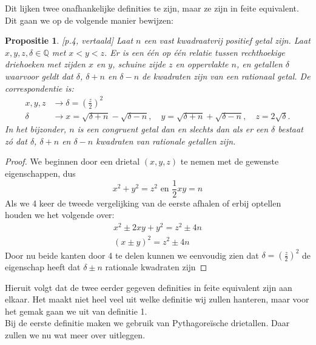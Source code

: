 \documentclass[12pt,reqno]{article}
\newcommand*{\QQ}{\ensuremath{\mathbb{Q}}}
\theoremstyle{theorem}
\newtheorem{proposition}[theorem]{Propositie}
\theoremstyle{definition}
\begin{document}
	Dit lijken twee onafhankelijke definities te zijn, maar ze zijn in feite equivalent. Dit gaan we op de volgende manier bewijzen: \\
	
	\begin{proposition}
		\cite{Koblitz}[p.4, vertaald] Laat $n$ een vast kwadraatvrij positief getal zijn. Laat $x,y,z,\delta \in\QQ$ met $x<y<z$. Er is een \'e\'en op \'e\'en relatie tussen rechthoekige driehoeken met zijden $x$ en $y$, schuine zijde $z$ en oppervlakte $n$, en getallen $\delta$ waarvoor geldt dat $\delta$, $\delta +n$ en $\delta -n$ de kwadraten zijn van een rationaal getal. De correspondentie is:
		\begin{align}
			x,y,z &\rightarrow \delta = \left( \frac{z}{2} \right)^2 \\
			\delta &\rightarrow x=\sqrt{\delta+n} - \sqrt{\delta-n},\quad y = \sqrt{\delta+n}+\sqrt{\delta-n},\quad z = 2\sqrt{\delta}.
		\end{align}
		In het bijzonder, $n$ is een congruent getal dan en slechts dan als er een $\delta$ bestaat z\'o dat $\delta$, $\delta+n$ en $\delta-n$ kwadraten van rationale getallen zijn.
	\end{proposition}
	\begin{proof}
		We beginnen door een drietal $(x,y,z)$ te nemen met de gewenste eigenschappen, dus
		\begin{equation*}
			x^2 + y^2 = z^2 \text{ en } \frac{1}{2}xy=n
		\end{equation*}
		Als we 4 keer de tweede vergelijking van de eerste afhalen of erbij optellen houden we het volgende over:
		\begin{align*}
			x^2 \pm 2xy + y^2 = z^2 \pm 4n \\
			(x \pm y)^2 = z^2 \pm 4n
		\end{align*}
		Door nu beide kanten door 4 te delen kunnen we eenvoudig zien dat $\delta = (\frac{z}{2})^2$ de eigenschap heeft dat $\delta \pm n$ rationale kwadraten zijn
	\end{proof}
	Hieruit volgt dat de twee eerder gegeven definities in feite equivalent zijn aan elkaar. Het maakt niet heel veel uit welke definitie wij zullen hanteren, maar voor het gemak gaan we uit van definitie 1. \\
	
	Bij de eerste definitie maken we gebruik van Pythagore\"ische drietallen. Daar zullen we nu wat meer over uitleggen.\\
	
\end{document}
